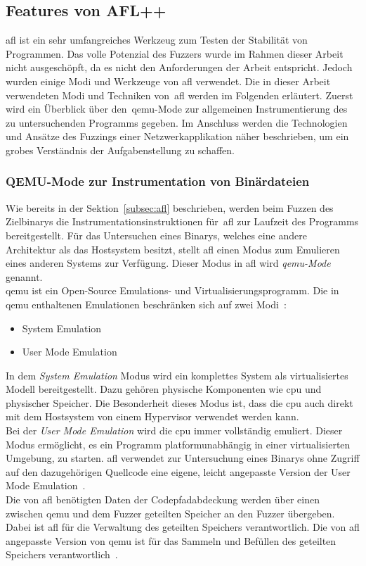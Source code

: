 
\subsection{Features von AFL++}\label{subsec:features-von-afl++}
\gls{afl} ist ein sehr umfangreiches Werkzeug zum Testen der Stabilität von Programmen.
Das volle Potenzial des Fuzzers wurde im Rahmen dieser Arbeit nicht ausgeschöpft, da es nicht den Anforderungen der Arbeit
entspricht.
Jedoch wurden einige Modi und Werkzeuge von \gls{afl} verwendet.
Die in dieser Arbeit verwendeten Modi und Techniken von~\gls{afl} werden im Folgenden erläutert.
Zuerst wird ein Überblick über den~\gls{qemu}-Mode zur allgemeinen Instrumentierung des zu untersuchenden Programms gegeben.
Im Anschluss werden die Technologien und Ansätze des Fuzzings einer Netzwerkapplikation näher beschrieben, um
ein grobes Verständnis der Aufgabenstellung zu schaffen.
\subsubsection{QEMU-Mode zur Instrumentation von Binärdateien}
Wie bereits in der Sektion~\ref{subsec:afl} beschrieben, werden beim Fuzzen des Zielbinarys die Instrumentationsinstruktionen
für~\gls{afl} zur Laufzeit des Programms bereitgestellt.
Für das Untersuchen eines Binarys, welches eine andere Architektur als das Hostsystem besitzt, stellt \gls{afl}
einen Modus zum Emulieren eines anderen Systems zur Verfügung.
Dieser Modus in \gls{afl} wird \textit{\gls{qemu}-Mode} genannt.\\
\gls{qemu} ist ein Open-Source Emulations- und Virtualisierungsprogramm.
Die in \gls{qemu} enthaltenen Emulationen beschränken sich auf zwei Modi~\cite{qemu}:
\begin{itemize}
    \item System Emulation
    \item User Mode Emulation
\end{itemize}
In dem \textit{System Emulation} Modus wird ein komplettes System als virtualisiertes Modell bereitgestellt.
Dazu gehören physische Komponenten wie \gls{cpu} und physischer Speicher.
Die Besonderheit dieses Modus ist, dass die \gls{cpu} auch direkt mit dem Hostsystem von einem Hypervisor verwendet werden
kann. \\
Bei der \textit{User Mode Emulation} wird die \gls{cpu} immer vollständig emuliert.
Dieser Modus ermöglicht, es ein Programm platformunabhängig in einer virtualisierten Umgebung, zu starten.
\gls{afl} verwendet zur Untersuchung eines Binarys ohne Zugriff auf den dazugehörigen Quellcode eine eigene, leicht
angepasste Version der User Mode Emulation~\cite{afl-qemu-how}.\\
\linebreak
Die von \gls{afl} benötigten Daten der Codepfadabdeckung werden über einen zwischen \gls{qemu} und dem Fuzzer geteilten
Speicher an den Fuzzer übergeben.
Dabei ist \gls{afl} für die Verwaltung des geteilten Speichers verantwortlich.
Die von \gls{afl} angepasste Version von \gls{qemu} ist für das Sammeln und Befüllen des geteilten Speichers verantwortlich~\cite{afl-qemu-coverage}.
